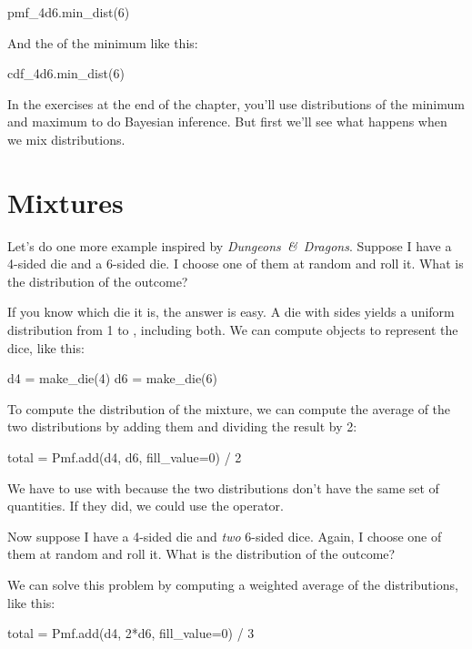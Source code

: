 \documentclass[12pt]{book}
\theoremstyle{exercise}
\begin{document}
\begin{code}
pmf_4d6.min_dist(6)
\end{code}

And the  of the minimum like this:

\begin{code}
cdf_4d6.min_dist(6)
\end{code}

In the exercises at the end of the chapter, you'll use distributions of the minimum and maximum to do Bayesian inference.
But first we'll see what happens when we mix distributions.


\section{Mixtures}
\label{mixture}

Let's do one more example inspired by {\it Dungeons~\&~Dragons}.
Suppose I have a 4-sided die and a 6-sided die.
I choose one of them at random and roll it.
What is the distribution of the outcome?

If you know which die it is, the answer is easy.
A die with  sides yields a uniform distribution from 1 to , including both.
We can compute  objects to represent the dice, like this:

\begin{code}
d4 = make_die(4)
d6 = make_die(6)
\end{code}

To compute the distribution of the mixture, we can compute the average of the two distributions by adding them and dividing the result by 2:

\begin{code}
total = Pmf.add(d4, d6, fill_value=0) / 2
\end{code}

We have to use  with  because the two distributions don't have the same set of quantities.
If they did, we could use the \py{+} operator.

Now suppose I have a 4-sided die and {\it two} 6-sided dice.
Again, I choose one of them at random and roll it.
What is the distribution of the outcome?

We can solve this problem by computing a weighted average of the distributions, like this:

\begin{code}
total = Pmf.add(d4, 2*d6, fill_value=0) / 3
\end{code}
\end{document}
